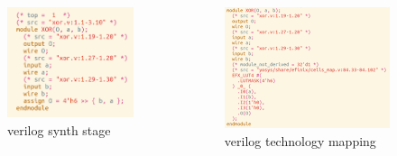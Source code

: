 \documentclass{beamer}
\begin{document}
{\begin{frame}[fragile]
  \begin{columns}
   \begin{column}{0.5\textwidth}
   \begin{figure}[h]
       \centering
       \includegraphics[width=0.75\linewidth]{images/synth_xor.png}
       \caption{verilog synth stage }
       \label{exa_block}
    \end{figure}
    \end{column}
   \begin{column}{0.5\textwidth}		
   \begin{figure}[h]
       \centering
       \includegraphics[width=0.90\linewidth]{images/efx_synth.png} 
       \caption{verilog technology mapping  }
       \label{exa_block}
    \end{figure}
   \end{column}
   \end{columns}
\end{frame}

}
\end{document}
